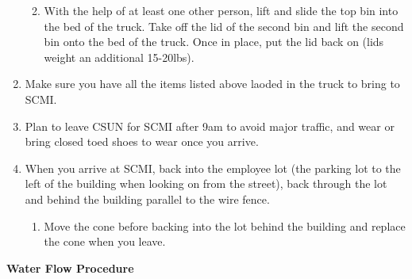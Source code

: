 \documentclass[]{book}
\providecommand{\tightlist}{%
  \setlength{\itemsep}{0pt}\setlength{\parskip}{0pt}}
\begin{document}
\begin{enumerate}
  \begin{enumerate}
  \def\labelenumii{\arabic{enumii}.}
  \tightlist
  \item
    With the help of at least one other person, lift and slide the top
    bin into the bed of the truck. Take off the lid of the second bin
    and lift the second bin onto the bed of the truck. Once in place,
    put the lid back on (lids weight an additional 15-20lbs).
  \end{enumerate}
\item
  Make sure you have all the items listed above laoded in the truck to
  bring to SCMI.
\item
  Plan to leave CSUN for SCMI after 9am to avoid major traffic, and wear
  or bring closed toed shoes to wear once you arrive.
\item
  When you arrive at SCMI, back into the employee lot (the parking lot
  to the left of the building when looking on from the street), back
  through the lot and behind the building parallel to the wire fence.

  \begin{enumerate}
  \def\labelenumii{\arabic{enumii}.}
  \tightlist
  \item
    Move the cone before backing into the lot behind the building and
    replace the cone when you leave.
  \end{enumerate}
\end{enumerate}

 \textbf{Water Flow Procedure}
\end{document}
